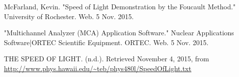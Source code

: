\documentclass[aps,prl,twocolumn,superscriptaddress]{revtex4-1}
\begin{document}
\setlength{\parindent}{0cm}

\begin{thebibliography}{99}  %

 McFarland, Kevin. "Speed of Light Demonstration by the Foucault Method." University of Rochester. Web. 5 Nov. 2015.     %

 "Multichannel Analyzer (MCA) Application Software." Nuclear Applications Software|ORTEC Scientific Equipment. ORTEC. Web. 5 Nov. 2015.

 THE SPEED OF LIGHT. (n.d.). Retrieved November 4, 2015, from \url{http://www.phys.hawaii.edu/~teb/phys480l/SpeedOfLight.txt}




\end{thebibliography}
\end{document}
